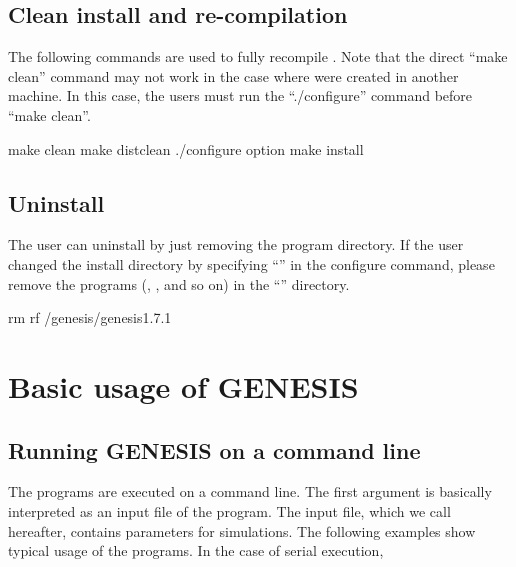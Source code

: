 \documentclass[a4paper,11pt,oneside,english]{sphinxmanual}
\begin{document}
\clearpage


\subsection{Clean install and re-compilation}
\label{\detokenize{01_Getting_Started:clean-install-and-re-compilation}}
The following commands are used to fully recompile .
Note that the direct “make clean” command may not work
in the case where  were created in another machine.
In this case, the users must run the “./configure” command before “make clean”.

\begin{sphinxVerbatim}[commandchars=\\\{\}]
\PYGZdl{} make clean
\PYGZdl{} make distclean
\PYGZdl{} ./configure \PYG{o}{[}option\PYG{o}{]}
\PYGZdl{} make install
\end{sphinxVerbatim}


\subsection{Uninstall}
\label{\detokenize{01_Getting_Started:uninstall}}
The user can uninstall  by just removing the program directory.
If the user changed the install directory by specifying “” in the configure command,
please remove the programs (, , and so on) in the “” directory.

\begin{sphinxVerbatim}[commandchars=\\\{\}]
\PYGZdl{} rm \PYGZhy{}rf /genesis/genesis\PYGZhy{}1.7.1
\end{sphinxVerbatim}

\clearpage


\section{Basic usage of GENESIS}
\label{\detokenize{01_Getting_Started:basic-usage-of-genesis}}

\subsection{Running GENESIS on a command line}
\label{\detokenize{01_Getting_Started:running-genesis-on-a-command-line}}
The  programs are executed on a command line.
The first argument is basically interpreted as an input file of the program.
The input file, which we call  hereafter, contains parameters for simulations.
The following examples show typical usage of the  programs.
In the case of serial execution,
\end{document}
